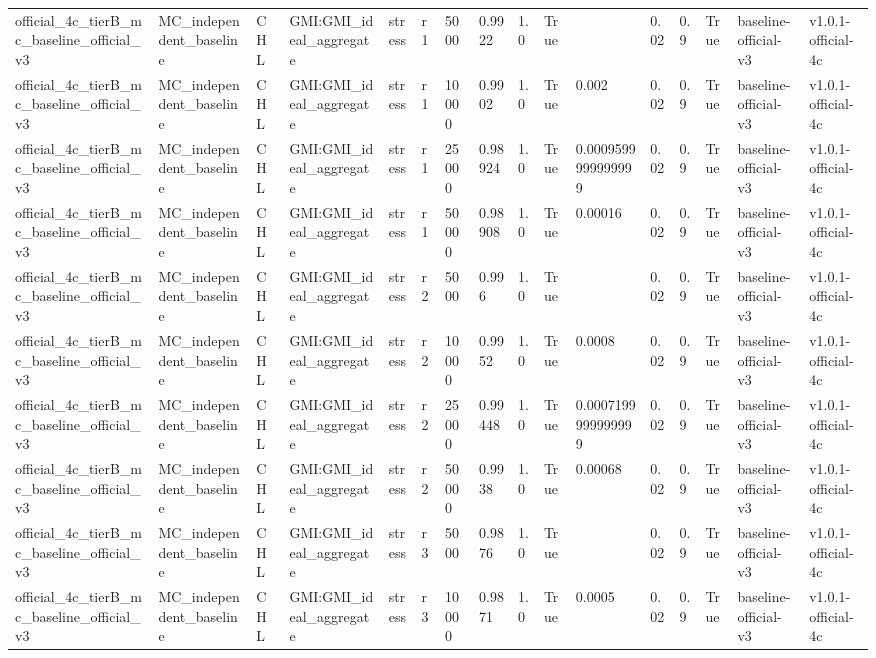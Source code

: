 \begin{table}[!htbp]
\begin{tabular}{llllllllllllllll}
official\_4c\_tierB\_mc\_baseline\_official\_v3 & MC\_independent\_baseline & CHL & GMI:GMI\_ideal\_aggregate & stress & r1 & 5000 & 0.9922 & 1.0 & True &  & 0.02 & 0.9 & True & baseline-official-v3 & v1.0.1-official-4c \\
official\_4c\_tierB\_mc\_baseline\_official\_v3 & MC\_independent\_baseline & CHL & GMI:GMI\_ideal\_aggregate & stress & r1 & 10000 & 0.9902 & 1.0 & True & 0.002 & 0.02 & 0.9 & True & baseline-official-v3 & v1.0.1-official-4c \\
official\_4c\_tierB\_mc\_baseline\_official\_v3 & MC\_independent\_baseline & CHL & GMI:GMI\_ideal\_aggregate & stress & r1 & 25000 & 0.98924 & 1.0 & True & 0.0009599999999999 & 0.02 & 0.9 & True & baseline-official-v3 & v1.0.1-official-4c \\
official\_4c\_tierB\_mc\_baseline\_official\_v3 & MC\_independent\_baseline & CHL & GMI:GMI\_ideal\_aggregate & stress & r1 & 50000 & 0.98908 & 1.0 & True & 0.00016 & 0.02 & 0.9 & True & baseline-official-v3 & v1.0.1-official-4c \\
official\_4c\_tierB\_mc\_baseline\_official\_v3 & MC\_independent\_baseline & CHL & GMI:GMI\_ideal\_aggregate & stress & r2 & 5000 & 0.996 & 1.0 & True &  & 0.02 & 0.9 & True & baseline-official-v3 & v1.0.1-official-4c \\
official\_4c\_tierB\_mc\_baseline\_official\_v3 & MC\_independent\_baseline & CHL & GMI:GMI\_ideal\_aggregate & stress & r2 & 10000 & 0.9952 & 1.0 & True & 0.0008 & 0.02 & 0.9 & True & baseline-official-v3 & v1.0.1-official-4c \\
official\_4c\_tierB\_mc\_baseline\_official\_v3 & MC\_independent\_baseline & CHL & GMI:GMI\_ideal\_aggregate & stress & r2 & 25000 & 0.99448 & 1.0 & True & 0.0007199999999999 & 0.02 & 0.9 & True & baseline-official-v3 & v1.0.1-official-4c \\
official\_4c\_tierB\_mc\_baseline\_official\_v3 & MC\_independent\_baseline & CHL & GMI:GMI\_ideal\_aggregate & stress & r2 & 50000 & 0.9938 & 1.0 & True & 0.00068 & 0.02 & 0.9 & True & baseline-official-v3 & v1.0.1-official-4c \\
official\_4c\_tierB\_mc\_baseline\_official\_v3 & MC\_independent\_baseline & CHL & GMI:GMI\_ideal\_aggregate & stress & r3 & 5000 & 0.9876 & 1.0 & True &  & 0.02 & 0.9 & True & baseline-official-v3 & v1.0.1-official-4c \\
official\_4c\_tierB\_mc\_baseline\_official\_v3 & MC\_independent\_baseline & CHL & GMI:GMI\_ideal\_aggregate & stress & r3 & 10000 & 0.9871 & 1.0 & True & 0.0005 & 0.02 & 0.9 & True & baseline-official-v3 & v1.0.1-official-4c \\

\end{tabular}
\end{table}
